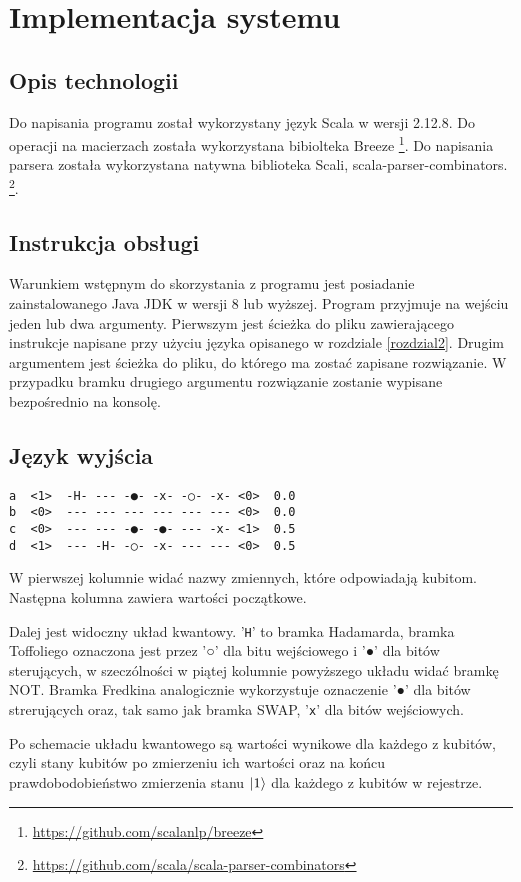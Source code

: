 \chapter{Implementacja systemu}
\thispagestyle{chapterBeginStyle}
\label{rozdzial3}

\section{Opis technologii}
Do napisania programu został wykorzystany język Scala w wersji 2.12.8. Do operacji na macierzach została wykorzystana bibiolteka Breeze \footnote{\url{https://github.com/scalanlp/breeze}}. Do napisania parsera została wykorzystana natywna biblioteka Scali, scala-parser-combinators.
\footnote{\url{https://github.com/scala/scala-parser-combinators}}.
\section{Instrukcja obsługi}
Warunkiem wstępnym do skorzystania z programu jest posiadanie zainstalowanego Java JDK w wersji 8 lub wyższej. Program przyjmuje na wejściu jeden lub dwa argumenty. Pierwszym jest ścieżka do pliku zawierającego instrukcje napisane przy użyciu języka opisanego w rozdziale \ref{rozdzial2}. Drugim argumentem jest ścieżka do pliku, do którego ma zostać zapisane rozwiązanie. W przypadku bramku drugiego argumentu rozwiązanie zostanie wypisane bezpośrednio na konsolę.
\section{Język wyjścia}
\begin{verbatim}
a  <1>  -H- --- -●- -x- -○- -x- <0>  0.0
b  <0>  --- --- --- --- --- --- <0>  0.0
c  <0>  --- --- -●- -●- --- -x- <1>  0.5
d  <1>  --- -H- -○- -x- --- --- <0>  0.5
\end{verbatim}
W pierwszej kolumnie widać nazwy zmiennych, które odpowiadają kubitom. Następna kolumna zawiera wartości początkowe. 
\par Dalej jest widoczny układ kwantowy. '\texttt{H}' to bramka Hadamarda, bramka Toffoliego oznaczona jest przez '○' dla bitu wejściowego i '●' dla bitów sterujących, w szeczólności w piątej kolumnie powyższego układu widać bramkę NOT. Bramka Fredkina analogicznie wykorzystuje oznaczenie '●' dla bitów strerujących oraz, tak samo jak bramka SWAP, '\texttt{x}' dla bitów wejściowych.
\par Po schemacie układu kwantowego są wartości wynikowe dla każdego z kubitów, czyli stany kubitów po zmierzeniu ich wartości oraz na końcu prawdobodobieństwo zmierzenia stanu $\ket{1}$ dla każdego z kubitów w rejestrze.